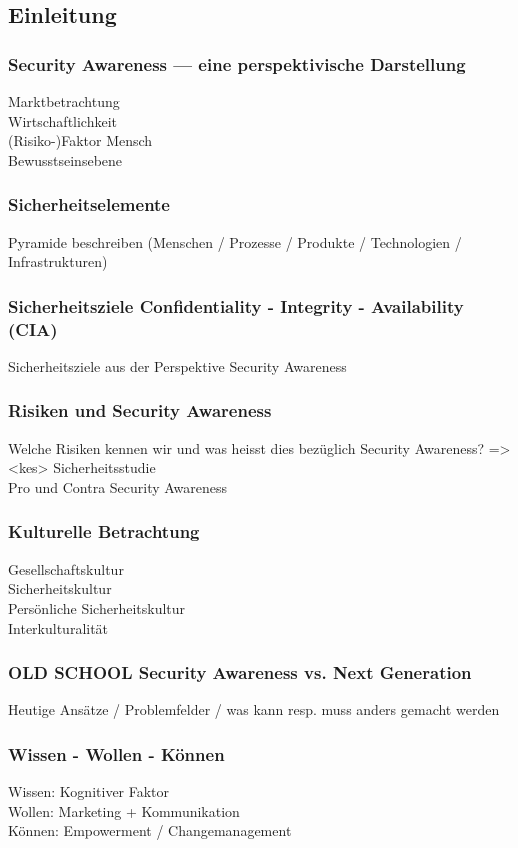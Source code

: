 \documentclass[../../main.tex]{subfiles}
\begin{document}
\subsection{Einleitung}

\subsubsection{Security Awareness — eine perspektivische Darstellung}
    Marktbetrachtung\\
    Wirtschaftlichkeit\\
    (Risiko-)Faktor Mensch\\
    Bewusstseinsebene
\subsubsection{Sicherheitselemente}
    Pyramide beschreiben (Menschen / Prozesse / Produkte / Technologien / Infrastrukturen)
\subsubsection{Sicherheitsziele Confidentiality - Integrity - Availability (CIA)}
    Sicherheitsziele aus der Perspektive Security Awareness
\subsubsection{Risiken und Security Awareness}
    Welche Risiken kennen wir und was heisst dies bezüglich Security Awareness? => <kes> Sicherheitsstudie\\
    Pro und Contra Security Awareness
\subsubsection{Kulturelle Betrachtung}
    Gesellschaftskultur\\
    Sicherheitskultur\\
    Persönliche Sicherheitskultur\\
    Interkulturalität
 \subsubsection{OLD SCHOOL Security Awareness vs. Next Generation}
    Heutige Ansätze / Problemfelder / was kann resp. muss anders gemacht werden
\subsubsection{Wissen - Wollen - Können}
    Wissen: Kognitiver Faktor\\
    Wollen: Marketing + Kommunikation\\
    Können: Empowerment / Changemanagement
\end{document}
